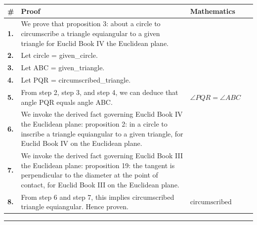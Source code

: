 \documentclass[11pt]{article}
\theoremstyle{definition}
\begin{document}
\begin{tabular}{@{} >{\raggedright\arraybackslash}p{} >{\raggedright\arraybackslash}p{} >{\raggedleft\arraybackslash}p{} @{}}
\textbf{\#} & \textbf{Proof} & \textbf{Mathematics} \\
\midrule
\textbf{1.} & We prove that proposition 3: about a circle to circumscribe a triangle equiangular to a given triangle for Euclid Book IV the Euclidean plane. & \\[0.45em]
\textbf{2.} & Let circle = given\_circle. & \\[0.45em]
\textbf{3.} & Let ABC = given\_triangle. & \\[0.45em]
\textbf{4.} & Let PQR = circumscribed\_triangle. & \\[0.45em]
\textbf{5.} & From step 2, step 3, and step 4, we can deduce that angle PQR equals angle ABC. & $\displaystyle \angle PQR = \angle ABC$ \\[0.45em]
\textbf{6.} & We invoke the derived fact governing Euclid Book IV the Euclidean plane: proposition 2: in a circle to inscribe a triangle equiangular to a given triangle, for Euclid Book IV on the Euclidean plane. & \\[0.45em]
\textbf{7.} & We invoke the derived fact governing Euclid Book III the Euclidean plane: proposition 19: the tangent is perpendicular to the diameter at the point of contact, for Euclid Book III on the Euclidean plane. & \\[0.45em]
\textbf{8.} & From step 6 and step 7, this implies circumscribed triangle equiangular. Hence proven. & $\displaystyle \text{circumscribed triangle equiangular}$ \\[0.45em]
\bottomrule
\end{tabular}
\label{thm:Geometry-Euclid Book IV-proposition_3_about_a_circle_to_circumscribe_a_triangle_equiangular_to_a_given_triangle}
\par\medskip\hrule
\end{document}
